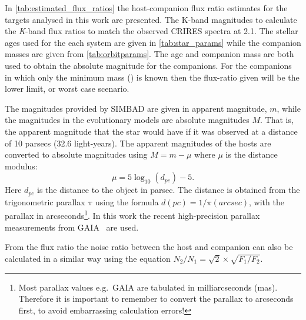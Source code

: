 In \cref{tab:estimated_flux_ratios} the host-companion flux ratio estimates for the targets analysed in this work are presented.
The {K}-band magnitudes to calculate the \emph{K}-band flux ratios to match the observed {CRIRES} spectra at 2.1\um{}.
The stellar ages used for the each system are given in \cref{tab:star_params} while the companion masses are given from \cref{tab:orbitparams}.
The age and companion mass are both used to obtain the absolute magnitude for the companions.
For the companions in which only the minimum mass (\Mtwosini{}) is known then the flux-ratio given will be the lower limit, or worst case scenario.


The magnitudes provided by {SIMBAD} are given in apparent magnitude, \(m\), while the magnitudes in the evolutionary models are absolute magnitudes \(M\).
That is, the apparent magnitude that the star would have if it was observed at a distance of 10 parsecs (32.6 light-years).
The apparent magnitudes of the hosts are converted to absolute magnitudes using \(M = m - \mu\) where \(\mu\) is the distance modulus:
\begin{equation}
\mu = 5 \log_{10}(d_{pc}) -5.\label{eqn:distance_modulus}
\end{equation}
Here $d_{pc}$ is the distance to the object in parsec.
The distance is obtained from the trigonometric parallax  $\pi$ using the formula $d(pc) = 1 /\pi(arcsec)$, with the parallax in arcseconds\footnote{Most parallax values e.g.\ GAIA are tabulated in milliarcseconds (mas).
Therefore it is important to remember to convert the parallax to arcseconds first, to avoid embarrassing calculation errors!}.
In this work the recent high-precision parallax measurements from GAIA~\citep{gaiacollaboration_gaia_2018} are used.

From the flux ratio the noise ratio between the host and companion can also be calculated in a similar way using the equation \(N_{2}/N_{1} = \sqrt{2} \times\sqrt{F_{1}/F_{2}}\).


